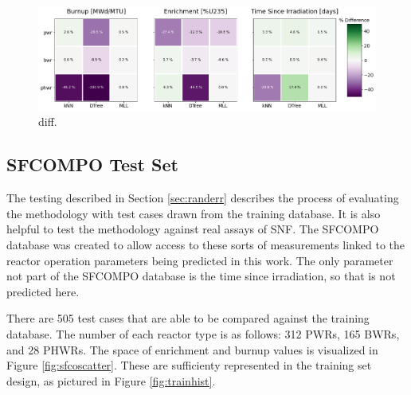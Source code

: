 \begin{figure}[!ht]
  \centering
  \includegraphics[width=1.1\textwidth]{./chapters/exp1/rxtr-type_known-unknown_diff.png}
  \caption{diff.}
  \label{fig:knownrxtr}
\end{figure}

\subsection{SFCOMPO Test Set}
\label{sec:sfcompo}

The testing described in Section \ref{sec:randerr} describes the process of
evaluating the methodology with test cases drawn from the training database.
It is also helpful to test the methodology against real assays of \gls{SNF}.
The \gls{SFCOMPO} database was created to allow access to these sorts of
measurements linked to the reactor operation parameters being predicted in this
work. The only parameter not part of the \gls{SFCOMPO} database is the time
since irradiation, so that is not predicted here. 

There are 505 test cases that are able to be compared against the training
database.  The number of each reactor type is as follows: 312 \gls{PWR}s, 165
\gls{BWR}s, and 28 \gls{PHWR}s. The space of enrichment and burnup values is
visualized in Figure \ref{fig:sfcoscatter}. These are sufficienty represented
in the training set design, as pictured in Figure \ref{fig:trainhist}.

